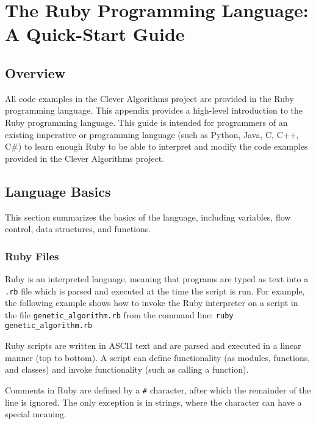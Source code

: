

\chapter{The Ruby Programming Language: A Quick-Start Guide}
\label{ch:appendix1}

\section*{Overview}
All code examples in the Clever Algorithms project are provided in the Ruby programming language.
This appendix provides a high-level introduction to the Ruby programming language. This guide is intended for programmers of an existing imperative or programming language (such as Python, Java, C, C++, C\#) to learn enough Ruby to be able to interpret and modify the code examples provided in the Clever Algorithms project.

\section*{Language Basics}
This section summarizes the basics of the language, including variables, flow control, data structures, and functions.

\subsection{Ruby Files}
Ruby is an interpreted language, meaning that programs are typed as text into a \texttt{.rb} file which is parsed and executed at the time the script is run. For example, the following example shows how to invoke the Ruby interpreter on a script in the file \texttt{genetic\_algorithm.rb} from the command line: \texttt{ruby genetic\_algorithm.rb}

Ruby scripts are written in ASCII text and are parsed and executed in a linear manner (top to bottom). A script can define functionality (as modules, functions, and classes) and invoke functionality (such as calling a function). 

Comments in Ruby are defined by a \texttt{\#} character, after which the remainder of the line is ignored. The only exception is in strings, where the character can have a special meaning.

